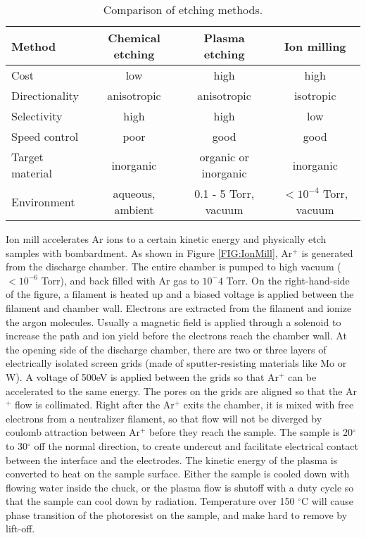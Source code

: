 \documentclass[pdftex, sectionletters]{pittetd}    %
\begin{document}
\begin{table}
	\centering
	\begin{tabular}{l|ccc}
		\hline
		Method	&	Chemical etching	&	Plasma etching	& Ion milling \\ \hline
		Cost	&	low	& high	& high \\ 
		Directionality	&	anisotropic	&	anisotropic	&	isotropic \\ 
		Selectivity	&	high	&	high	&	low \\
		Speed control	&	poor	&	good	&	good \\
		Target material	&	inorganic	&	organic or inorganic	&	inorganic \\
		Environment	&	aqueous, ambient	&	0.1 - 5 Torr, vacuum	&	$< 10^{-4}$ Torr, vacuum \\
		\hline  
		
	\end{tabular}
	\caption{Comparison of etching methods.}
	\label{tab:etching}
	
\end{table}

Ion mill accelerates Ar ions to a certain kinetic energy and physically etch samples with bombardment. As shown in Figure \ref{FIG:IonMill}, Ar$^+$ is generated from the discharge chamber. The entire chamber is pumped to high vacuum ($< 10^{-6}$ Torr), and back filled with Ar gas to $10^-4$ Torr. On the right-hand-side of the figure, a filament is heated up and a biased voltage is applied between the filament and chamber wall. Electrons are extracted from the filament and ionize the argon molecules. Usually a magnetic field is applied through a solenoid to increase the path and ion yield before the electrons reach the chamber wall. At the opening side of the discharge chamber, there are two or three layers of electrically isolated screen grids (made of sputter-resisting materials like Mo or W). A voltage of 500eV is applied between the grids so that Ar$^+$ can be accelerated to the same energy. The pores on the grids are aligned so that the Ar$^{+}$ flow is collimated. Right after the Ar$^{+}$ exits the chamber, it is mixed with free electrons from a neutralizer filament, so that flow will not be diverged by coulomb attraction between Ar$^{+}$ before they reach the sample. The sample is 20$^{\circ}$ to 30$^{\circ}$ off the normal direction, to create undercut and facilitate electrical contact between the interface and the electrodes. The kinetic energy of the plasma is converted to heat on the sample surface. Either the sample is cooled down with flowing water inside the chuck, or the plasma flow is shutoff with a duty cycle so that the sample can cool down by radiation. Temperature over 150 $^{\circ}$C will cause phase transition of the photoresist on the sample, and make hard to remove by lift-off.
\end{document}
